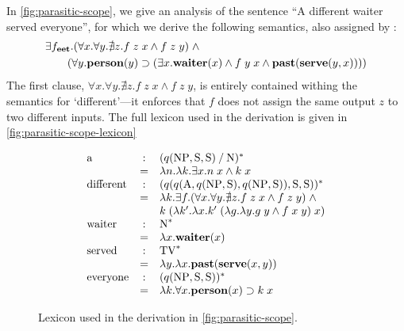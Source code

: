 In \autoref{fig:parasitic-scope}, we give an analysis of the sentence
``A different waiter served everyone'', for which we derive the
following semantics, also assigned by \citeauthor{kiselyov2015b}:
\begin{align*}
  &\exists{f_{\ensuremath{\mathbf{e}}\ensuremath{\mathbf{e}}\ensuremath{\mathbf{t}}}}.(\forall{x}.\forall{y}.\nexists{z}.f\;z\;x\wedge{f\;z\;y})\;\wedge\\
  &\qquad(\forall{y}.\mathbf{person}(y)\supset(\exists{x}.\mathbf{waiter}(x)\wedge{f\;y\;x\wedge\ensuremath{\mathbf{past}}(\ensuremath{\mathbf{serve}}(y,x))}))
\end{align*}
The first clause, $\forall{x}.\forall{y}.\nexists{z}.f\;z\;x\wedge
{f\;z\;y}$, is entirely contained withing the semantics for
`different'---it enforces that $f$ does not assign the same output $z$
to two different inputs. The full lexicon used in the derivation is
given in \autoref{fig:parasitic-scope-lexicon}
\begin{figure}[hb]
  \centering
  \begin{mdframed}
    \[
      \renewcommand*{\arraystretch}{1}
      \begin{array}{l c l}
        \text{a}
        &:& \tr[{(q(\NP,\S,\S)\impl\N)}]\\
        &=& \lambda n. \lambda k. \exists x. n\;x\wedge k\;x\\

        \text{different}
        &:& \tr[{(q(q(\A,q(\NP,\S),q(\NP,\S)),\S,\S))}]\\
        &=& \lambda k. \exists f. (\forall x.\forall y.\nexists z.f\;z\;x\wedge f\;z\;y)\;\wedge\\
        & & k\;(\lambda k'.\lambda x.k'\;(\lambda g.\lambda y.g\;y\wedge f\;x\;y)\;x)\\

        \text{waiter}
        &:& \tr[\N]\\
        &=& \lambda x.\WAITER(x)\\

        \text{served}
        &:& \tr[\TV]\\
        &=& \lambda y.\lambda x.\PAST(\SERVE(x,y))\\

        \text{everyone}
        &:& \tr[{(q(\NP,\S,\S))}]\\
        &=& \lambda k.\forall x.\PERSON(x)\supset k\;x
      \end{array}
    \]
  \end{mdframed}
  \caption{Lexicon used in the derivation in \autoref{fig:parasitic-scope}.}
  \label{fig:parasitic-scope-lexicon}
\end{figure}
%

%



